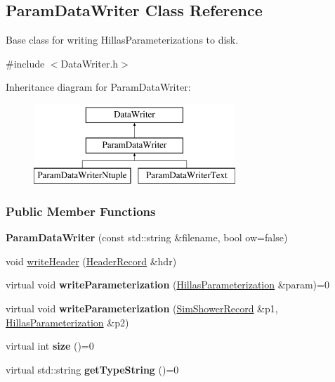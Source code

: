 \hypertarget{classParamDataWriter}{
\subsection{ParamDataWriter Class Reference}
\label{classParamDataWriter}
}


Base class for writing HillasParameterizations to disk.  




{\ttfamily \#include $<$DataWriter.h$>$}

Inheritance diagram for ParamDataWriter:\begin{figure}[H]
\begin{center}
\leavevmode
\includegraphics[height=3.000000cm]{classParamDataWriter}
\end{center}
\end{figure}
\subsubsection*{Public Member Functions}
\begin{DoxyCompactItemize}
\item 
\hypertarget{classParamDataWriter_a030c4a57dad508e7767ec321af9a4f2d}{
{\bfseries ParamDataWriter} (const std::string \&filename, bool ow=false)}
\label{classParamDataWriter_a030c4a57dad508e7767ec321af9a4f2d}

\item 
void \hyperlink{classParamDataWriter_a0a70e79b1d085e10036d5a0d437e624b}{writeHeader} (\hyperlink{structHeaderRecord}{HeaderRecord} \&hdr)
\item 
\hypertarget{classParamDataWriter_a35fc7998a33afab877c035eaba013f14}{
virtual void {\bfseries writeParameterization} (\hyperlink{structHillasParameterization}{HillasParameterization} \&param)=0}
\label{classParamDataWriter_a35fc7998a33afab877c035eaba013f14}

\item 
\hypertarget{classParamDataWriter_a6e7ae68618d46d8741fc5ff4b0a5542f}{
virtual void {\bfseries writeParameterization} (\hyperlink{structSimShowerRecord}{SimShowerRecord} \&p1, \hyperlink{structHillasParameterization}{HillasParameterization} \&p2)}
\label{classParamDataWriter_a6e7ae68618d46d8741fc5ff4b0a5542f}

\item 
\hypertarget{classParamDataWriter_a5ea7b99411dd0096a8ee50111b2c193d}{
virtual int {\bfseries size} ()=0}
\label{classParamDataWriter_a5ea7b99411dd0096a8ee50111b2c193d}

\item 
\hypertarget{classParamDataWriter_a65100e91f53c44adb84fd5d541ab7c01}{
virtual std::string {\bfseries getTypeString} ()=0}
\label{classParamDataWriter_a65100e91f53c44adb84fd5d541ab7c01}

\end{DoxyCompactItemize}


